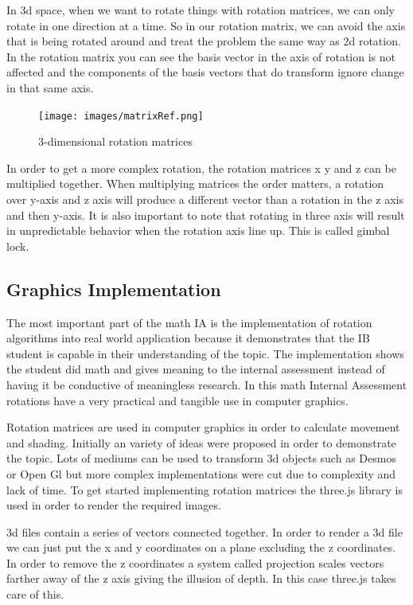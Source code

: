 In 3d space, when we want to rotate things with rotation matrices, we can only rotate in one direction at a time. So in our rotation matrix, we can avoid the axis that is being rotated around and treat the problem the same way as 2d rotation. In the rotation matrix you can see the basis vector in the axis of rotation is not affected and the components of the basis vectors that do transform ignore change in that same axis.

\begin{figure}[ht]\centering %
	\texttt{[image: images/matrixRef.png]}
	\caption{3-dimensional rotation matrices}
	\label{fig:3dTransformationDiagram}
\end{figure}

In order to get a more complex rotation, the rotation matrices x y and z can be multiplied together. When multiplying matrices the order matters, a rotation over y-axis and z axis will produce a different vector than a rotation in the z axis and then y-axis. It is also important to note that rotating in three axis will result in unpredictable behavior when the rotation axis line up. This is called gimbal lock.

\subsection{Graphics Implementation}
\hspace{\parindent}%
The most important part of the math IA is the implementation of rotation algorithms into real world application because it demonstrates that the IB student is capable in their understanding of the topic. The implementation shows the student did math and gives meaning to the internal assessment instead of having it be conductive of meaningless research. In this math Internal Assessment rotations have a very practical and tangible use in computer graphics. 

Rotation matrices are used in computer graphics in order to calculate movement and shading. Initially an variety of ideas were proposed in order to demonstrate the topic. Lots of mediums can be used to transform 3d objects such as Desmos or Open Gl but more complex implementations were cut due to complexity and lack of time. To get started implementing rotation matrices the three.js library is used in order to render the required images.

3d files contain a series of vectors connected together. In order to render a 3d file we can just put the x and y coordinates on a plane excluding the z coordinates. In order to remove the z coordinates a system called projection scales vectors farther away of the z axis giving the illusion of depth. In this case three.js takes care of this.

